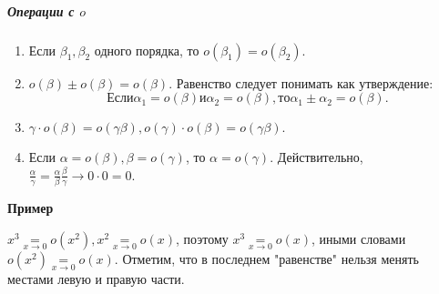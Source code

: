 \subparagraph{Операции с $o$}
\begin{enumerate}
  \item Если $\beta_1, \beta_2$ одного порядка, то $o(\beta_1) = o(\beta_2)$.
  \item $o(\beta) \pm o(\beta) = o(\beta)$.
  Равенство следует понимать как утверждение:
  $$Если \alpha_1 = o(\beta) и \alpha_2 = o(\beta), то \alpha_1 \pm \alpha_2 = o(\beta).$$
  \item $\gamma \cdot o(\beta) = o(\gamma \beta), o(\gamma) \cdot o(\beta) = o(\gamma \beta).$
  \item Если $\alpha = o(\beta), \beta = o(\gamma)$, то $\alpha = o(\gamma)$.
  Действительно, $\frac{\alpha}{\gamma} = \frac{\alpha}{\beta} \frac{\beta}{\gamma} \rightarrow 0 \cdot 0 = 0$.
\end{enumerate}
\par\medskip \textbf{Пример}\par $x^3 \underset{x \rightarrow 0}{=} o(x^2), x^2 \underset{x \rightarrow 0}{=} o(x)$, поэтому $x^3 \underset{x \rightarrow 0}{=} o(x)$, иными словами $o(x^2) \underset{x \rightarrow 0}{=} o(x)$. Отметим, что в последнем "равенстве" нельзя менять местами левую и правую части.
